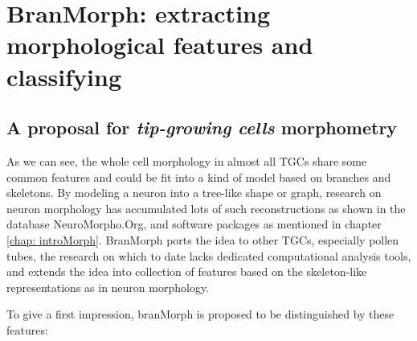 \chapter[BranMorph: a morphological tool for TGCs]{BranMorph: extracting morphological features and classifying}
\label{chap: branMorph}

\section{A proposal for \emph{tip-growing cells} morphometry}

As we can see, the whole cell morphology in almost all \acfp{TGC} share some common features and could be fit into a kind of model based on branches and skeletons. By modeling a neuron into a tree-like shape or graph, research on neuron morphology has accumulated lots of such reconstructions as shown in the database NeuroMorpho.Org, and software packages as mentioned in chapter \ref{chap: introMorph}. BranMorph ports the idea to other \acfp{TGC}, especially pollen tubes, the research on which to date lacks dedicated computational analysis tools, and extends the idea into collection of features based on the skeleton-like representations as in neuron morphology.

To give a first impression, branMorph is proposed to be distinguished by these features:

